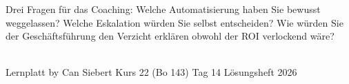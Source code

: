 \documentclass[11pt,a4paper,oneside]{article}
\begin{document}
\medskip
\begin{infobox}
Drei Fragen für das Coaching: Welche Automatisierung haben Sie bewusst weggelassen? Welche Eskalation würden Sie selbst entscheiden? Wie würden Sie der Geschäftsführung den Verzicht erklären \textendash{} obwohl der ROI verlockend wäre?
\end{infobox}

\vspace{1cm}
\noindent{\color{lpAccent}\rule{\linewidth}{0.6pt}}\\[4pt]
{\footnotesize\sffamily\color{lpGray}Lernplatt \textperiodcentered{} by Can Siebert \textperiodcentered{} Kurs 22 (Bo 143) \textperiodcentered{} Tag 14 \textperiodcentered{} Lösungsheft \textperiodcentered{} \textcopyright{} 2026}
\end{document}
